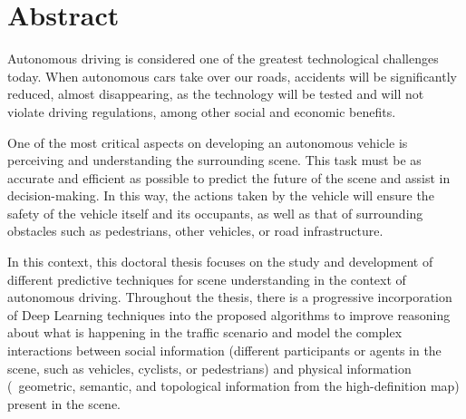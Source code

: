 %
%
%
% 
%
%
%
%

\chapter*{Abstract}
\label{cha:abstract}


Autonomous driving is considered one of the greatest technological challenges today. When autonomous cars take over our roads, accidents will be significantly reduced, almost disappearing, as the technology will be tested and will not violate driving regulations, among other social and economic benefits.

One of the most critical aspects on developing an autonomous vehicle is perceiving and understanding the surrounding scene. This task must be as accurate and efficient as possible to predict the future of the scene and assist in decision-making. In this way, the actions taken by the vehicle will ensure the safety of the vehicle itself and its occupants, as well as that of surrounding obstacles such as pedestrians, other vehicles, or road infrastructure.

In this context, this doctoral thesis focuses on the study and development of different predictive techniques for scene understanding in the context of autonomous driving. Throughout the thesis, there is a progressive incorporation of Deep Learning techniques into the proposed algorithms to improve reasoning about what is happening in the traffic scenario and model the complex interactions between social information (different participants or agents in the scene, such as vehicles, cyclists, or pedestrians) and physical information (\ie \ geometric, semantic, and topological information from the high-definition map) present in the scene.

